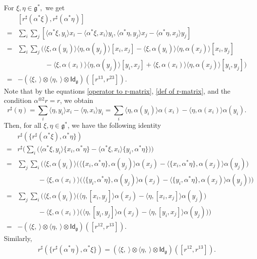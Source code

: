 \documentclass[a4paper,11pt]{amsart}
\theoremstyle{plain}
\theoremstyle{definition}
\theoremstyle{remark}
\numberwithin{equation}{section}
\begin{document}
For $\xi,\eta\in\mathfrak{g}^*,$ we get
\begin{align}\label{identity1}
&[r^{\sharp}(\alpha^*\xi),r^{\sharp}(\alpha^*\eta)]\\\nonumber
=&\sum_i\sum_j[\langle \alpha^*\xi,y_i\rangle x_i- \langle \alpha^*\xi,x_i\rangle y_i,\langle \alpha^*\eta,y_j\rangle x_j- \langle \alpha^*\eta,x_j\rangle y_j]\\\nonumber
=&\sum_{i}\sum_j \bigg(\langle \xi,\alpha(y_i)\rangle \langle \eta,\alpha(y_j)\rangle [x_i,x_j]-\langle \xi,\alpha(y_i)\rangle \langle \eta,\alpha(x_j)\rangle [x_i,y_j] \\\nonumber
&\quad\quad\quad\quad-\langle \xi,\alpha(x_i)\rangle \langle \eta,\alpha(y_j)\rangle [y_i,x_j]+\langle \xi,\alpha(x_i)\rangle \langle \eta,\alpha(x_j)\rangle [y_i,y_j]\bigg)\\\nonumber
=&-(\langle\xi,~\rangle\otimes\langle\eta,~\rangle\otimes \mathsf{Id}_\mathfrak{g})([r^{13},r^{23}]).
\end{align}
Note that by the equations \eqref{operator to r-matrix}, \eqref{def of r-matrix}, and the condition $\alpha^{\otimes 2}r=r$, we obtain
 $$r^{\sharp}(\eta)=\sum_i\langle \eta,y_i\rangle x_i- \langle \eta, x_i\rangle y_i=\sum_i\langle \eta,\alpha(y_i)\rangle \alpha(x_i)- \langle \eta, \alpha(x_i)\rangle \alpha(y_i).$$ 
Then, for all $\xi,\eta\in\mathfrak{g}^*$, we have the following identity    
\begin{align}\label{identity2}
&r^{\sharp}(\{r^{\sharp}(\alpha^*\xi),\alpha^*\eta\})\\\nonumber
=&r^{\sharp}\bigg(\sum_{i} \big(\langle \alpha^*\xi,y_i\rangle \{x_i,\alpha^*\eta\}- \langle \alpha^*\xi,x_i\rangle \{y_i,\alpha^*\eta\}\big)\bigg)\\\nonumber
=&\sum_j\sum_i\bigg(\langle \xi,\alpha(y_i)\rangle \Big(\langle\{x_i,\alpha^*\eta\},\alpha(y_j)\rangle \alpha(x_j)-  \langle\{x_i,\alpha^*\eta\},\alpha(x_j)\rangle \alpha(y_j)\Big)\\\nonumber 
&\quad \quad \quad-\langle \xi,\alpha(x_i)\rangle \Big(\langle\{y_i,\alpha^*\eta\},\alpha(y_j)\rangle \alpha(x_j)-  \langle\{y_i,\alpha^*\eta\},\alpha(x_j)\rangle \alpha(y_j)\Big)\bigg)\\\nonumber
=&\sum_j\sum_i\bigg(\langle \xi,\alpha(y_i)\rangle \Big(\langle \eta,[x_i,y_j]\rangle \alpha(x_j)-  \langle\eta,[x_i,x_j]\rangle \alpha(y_j)\Big)\\\nonumber 
&\quad \quad \quad-\langle \xi,\alpha(x_i)\rangle \Big(\langle\eta,[y_i,y_j]\rangle \alpha(x_j)-  \langle\eta,[y_i,x_j]\rangle \alpha(y_j)\Big)\bigg)\\\nonumber
=&-(\langle\xi,~\rangle\otimes\langle\eta,~\rangle\otimes \mathsf{Id}_\mathfrak{g})([r^{12},r^{13}]).
\end{align}
Similarly,
\begin{align}\label{identity3}
r^{\sharp}(\{r^{\sharp}(\alpha^*\eta),\alpha^*\xi\})=(\langle\xi,~\rangle\otimes\langle\eta,~\rangle\otimes \mathsf{Id}_\mathfrak{g})([r^{12},r^{13}]).
\end{align}
\end{document}
